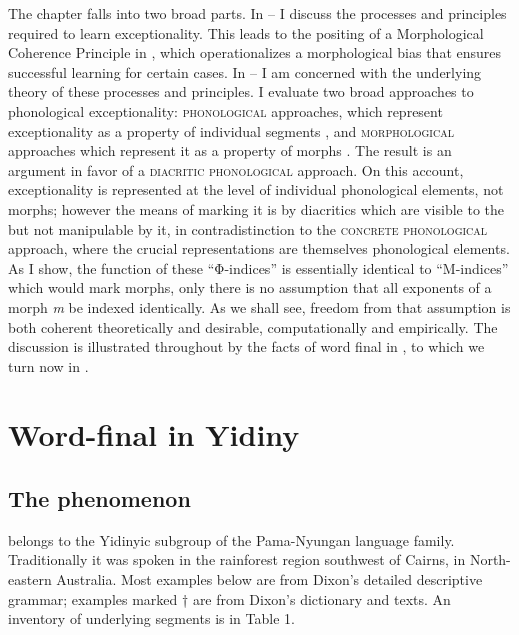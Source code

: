 \documentclass[output=paper,
modfonts
]{LSP/langsci}
\begin{document}
\largerpage[-1]%
The chapter falls into two broad parts. In -- I discuss the processes and principles required to learn exceptionality. This leads to the positing of a Morphological Coherence Principle in , which operationalizes a morphological bias that ensures successful learning for certain cases. In -- I am concerned with the underlying theory of these processes and principles. I evaluate two broad approaches to phonological exceptionality: \textsc{phonological} approaches, which represent exceptionality as a property of individual segments \citep{bloomfield1939,kiparsky1982c,inkelas1995,zoll1996}, and \textsc{morphological} approaches which represent it as a property of morphs \citep{chomsky1964,chomskyhalle1968,zonneveld1978,pater2000r}. The result is an argument in favor of a \textsc{diacritic} \textsc{phonological} approach. On this account, exceptionality is represented at the level of individual phonological elements, not morphs; however the means of marking it is by diacritics which are visible to the  but not manipulable by it, in contradistinction to the \textsc{concrete phonological} approach, where the crucial representations are themselves phonological elements. As I show, the function of these ``Φ-indices'' is essentially identical to ``M-indices'' which would mark morphs, only there is no assumption that all exponents of a morph \textit{m} be indexed identically. As we shall see, freedom from that assumption is both coherent theoretically and desirable, computationally and empirically. The discussion is illustrated throughout by the facts of word final  in , to which we turn now in .

\section[Word-final \isi{deletion} in \ili{Yidiny}]{Word-final  in Yidiny}\label{sec:round:2}
\label{bkm:Ref335232760}\subsection{The phenomenon}
\largerpage[-1]
 \citep{dixon1977a} belongs to the Yidinyic subgroup of the Pama-Nyungan language family. Traditionally it was spoken in the rainforest region southwest of Cairns, in North-eastern Australia. Most examples below are from Dixon's \citeyearpar{dixon1977a} detailed descriptive grammar; examples marked † are from Dixon's \citeyearpar{dixon1991} dictionary and texts. An inventory of underlying segments is in Table 1.
\end{document}
